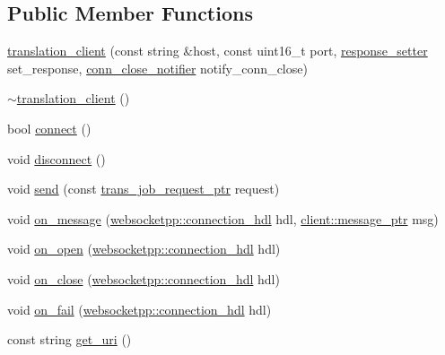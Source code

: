 \subsection*{Public Member Functions}
\begin{DoxyCompactItemize}
\item 
\hyperlink{classuva_1_1smt_1_1bpbd_1_1client_1_1translation__client_ae892d7cccc21df88b04e9d26c4f8c23c}{translation\+\_\+client} (const string \&host, const uint16\+\_\+t port, \hyperlink{classuva_1_1smt_1_1bpbd_1_1client_1_1translation__client_aee49acfd2764e30f042c29b1d365f21d}{response\+\_\+setter} set\+\_\+response, \hyperlink{classuva_1_1smt_1_1bpbd_1_1client_1_1translation__client_a6bb76738c95be98f5d13370d8e6a1176}{conn\+\_\+close\+\_\+notifier} notify\+\_\+conn\+\_\+close)
\item 
\hyperlink{classuva_1_1smt_1_1bpbd_1_1client_1_1translation__client_ad3e2c66b9740dafbcbb1dd2be2cc8116}{$\sim$translation\+\_\+client} ()
\item 
bool \hyperlink{classuva_1_1smt_1_1bpbd_1_1client_1_1translation__client_a84545fb376d8deb41ce74b552ca5d9a0}{connect} ()
\item 
void \hyperlink{classuva_1_1smt_1_1bpbd_1_1client_1_1translation__client_a3112325b486803b3e788b6f3ff3ad755}{disconnect} ()
\item 
void \hyperlink{classuva_1_1smt_1_1bpbd_1_1client_1_1translation__client_a38bf3e2d812a0d7fe12a3f3f5f6af7e3}{send} (const \hyperlink{namespaceuva_1_1smt_1_1bpbd_1_1common_1_1messaging_af373ab262c0cab837c6ebe5e2eb62ea2}{trans\+\_\+job\+\_\+request\+\_\+ptr} request)
\item 
void \hyperlink{classuva_1_1smt_1_1bpbd_1_1client_1_1translation__client_a2249d6ab4f4dd15a37703d7796a60c48}{on\+\_\+message} (\hyperlink{namespacewebsocketpp_a6b3d26a10ee7229b84b776786332631d}{websocketpp\+::connection\+\_\+hdl} hdl, \hyperlink{classwebsocketpp_1_1endpoint_a585ecbbfd9689d4e4229e4c8378bd672}{client\+::message\+\_\+ptr} msg)
\item 
void \hyperlink{classuva_1_1smt_1_1bpbd_1_1client_1_1translation__client_a1103c5f24564a2d96484c1cd0042946e}{on\+\_\+open} (\hyperlink{namespacewebsocketpp_a6b3d26a10ee7229b84b776786332631d}{websocketpp\+::connection\+\_\+hdl} hdl)
\item 
void \hyperlink{classuva_1_1smt_1_1bpbd_1_1client_1_1translation__client_ad37d08d88eff9a5eadf5ce26dc01b80a}{on\+\_\+close} (\hyperlink{namespacewebsocketpp_a6b3d26a10ee7229b84b776786332631d}{websocketpp\+::connection\+\_\+hdl} hdl)
\item 
void \hyperlink{classuva_1_1smt_1_1bpbd_1_1client_1_1translation__client_a749abfbb48da4b4afeb9059f8444bbba}{on\+\_\+fail} (\hyperlink{namespacewebsocketpp_a6b3d26a10ee7229b84b776786332631d}{websocketpp\+::connection\+\_\+hdl} hdl)
\item 
const string \hyperlink{classuva_1_1smt_1_1bpbd_1_1client_1_1translation__client_a3eda42ede736d896f012aabefaabad69}{get\+\_\+uri} ()
\end{DoxyCompactItemize}
